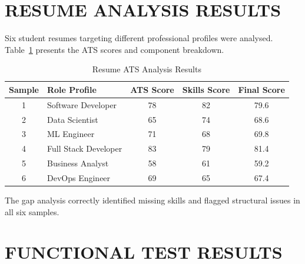 \documentclass[12pt,a4paper]{report}
\begin{document}
\section{RESUME ANALYSIS RESULTS}

Six student resumes targeting different professional profiles were analysed. Table~\ref{tab:resumeresult} presents the ATS scores and component breakdown.

\begin{table}[H]
    \centering
    \caption{Resume ATS Analysis Results}
    \label{tab:resumeresult}
    \begin{tabular}{|c|l|c|c|c|}
        \hline
        \textbf{Sample} & \textbf{Role Profile} & \textbf{ATS Score} & \textbf{Skills Score} & \textbf{Final Score} \\
        \hline
        1 & Software Developer      & 78 & 82 & 79.6 \\
        2 & Data Scientist          & 65 & 74 & 68.6 \\
        3 & ML Engineer             & 71 & 68 & 69.8 \\
        4 & Full Stack Developer    & 83 & 79 & 81.4 \\
        5 & Business Analyst        & 58 & 61 & 59.2 \\
        6 & DevOps Engineer         & 69 & 65 & 67.4 \\
        \hline
    \end{tabular}
\end{table}

The gap analysis correctly identified missing skills and flagged structural issues in all six samples.

\section{FUNCTIONAL TEST RESULTS}
\end{document}
